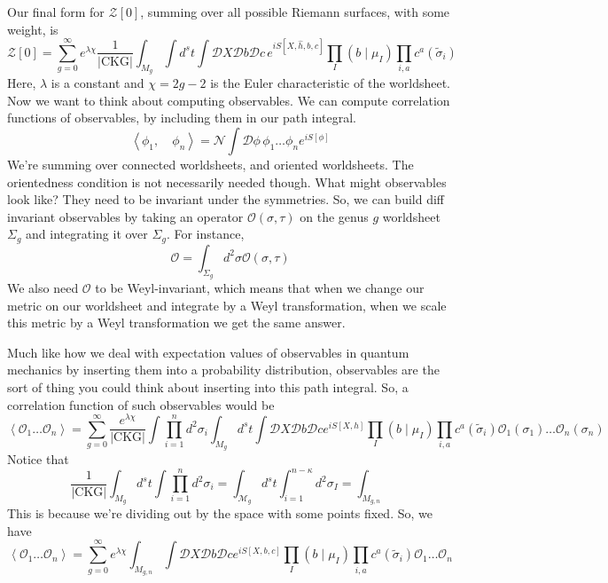 \documentclass[11pt, oneside]{article}   	%
\theoremstyle{slanted}
\begin{document}
Our final form for $ \mathcal{ Z } \left[  0  \right]  $, 
summing over all possible Riemann surfaces, with some weight, is 
\[
\mathcal{ Z } \left[  0  \right]   = \sum _{ g = 0 } ^ \infty 
e ^{ \lambda \chi }
\frac{1}{|\text{CKG}|} \int _{ M _ g } \int d ^ s t \int \mathcal{ D } X \mathcal{ D } b 
\mathcal{ D } c \, e ^{  i S \left[  X, \hat{ h }, b, c  \right]  } 
\prod_{ I } \left( b \mid \mu _ I  \right)  \prod _{ i , a } c ^ a \left( 
\tilde{ \sigma }_ i   \right) 
\] Here, $ \lambda $ is a constant and $ \chi  = 2g - 2 $ is 
the Euler characteristic of the worldsheet. 
Now we want to think about computing 
observables. We can compute correlation functions 
of observables, by including them 
in our path integral. 
\[
\left< \phi _1 , \quad \phi _ n  \right> 
= \mathcal{ N }\int \mathcal{ D } \phi \, \phi _ 1 \dots \phi _ n e ^{ i S \left[  \phi  \right] }
\] We're summing over connected worldsheets, 
and oriented worldsheets. The orientedness condition is not 
necessarily needed though. 
What might observables look like? They need 
to be invariant under the symmetries. So, we
can build diff invariant observables by taking 
an operator $ \mathcal{ O } \left( \sigma, \tau  \right)  $ 
on the genus $ g $ worldsheet $ \Sigma _ g $ and 
integrating it over $ \Sigma _ g $. For instance, 
\[
\mathcal{ O }  = \int _{ \Sigma _ g } d ^ 2 \sigma \mathcal{ O } \left( \sigma, \tau  \right) 
\] We also need $ \mathcal{ O } $ to be Weyl-invariant, 
which means that when we change our metric 
on our worldsheet and integrate by a Weyl transformation, 
when we scale this metric by a Weyl transformation we get 
the same answer. 

Much like how we deal with expectation values 
of observables in quantum mechanics 
by inserting them into a 
probability distribution, observables 
are the sort of thing you could think about 
inserting into this path integral. 
So, a correlation function of such observables 
would be 
\[
\left< \mathcal{ O }_ 1  \dots 
\mathcal{ O } _ n   \right>  = 
\sum _{ g = 0 } ^ \infty \frac{e ^{ \lambda \chi } }{ |\text{CKG}|}
\int \prod_{ i  =1  }^ n d ^ 2 \sigma _ i \int _{ M _ g } 
d ^ s t \int \mathcal{ D } X \mathcal{ D } b 
\mathcal{ D } c e ^{  i S \left[  X, h  \right]   } 
\prod _ I \left( b \mid \mu _ I  \right)  
\prod_{ i , a } c ^ a \left( \tilde{ \sigma } _ i   \right)  
\mathcal{ O  }_ 1 \left( \sigma _ 1  \right)  \dots 
\mathcal{ O} _ n \left( \sigma _n  \right)  
\] Notice that 
\[
\frac{1}{|\text{CKG}|} \int _{M _ g } d ^ s t \int \prod_{ i = 1 } ^ n 
d ^ 2 \sigma _ i  = \int _{ \mathcal{ M } _ g } d ^ s t \int _{ i  = 1 } 
^{ n - \kappa } d ^ 2 \sigma _ I  = \int _{ M _ {g, n }}
\] This is because we're dividing 
out by the space with some points fixed.
So, we have 
\[
\left< \mathcal{ O } _ 1  \dots \mathcal{ O } _ n  \right> 
= \sum_{ g = 0 } ^ \infty e ^{ \lambda \chi } 
\int _{ M _{g, n } } \int \mathcal{ D } X \mathcal{ D } b \mathcal{ D } c 
e ^{ i S \left[  X, b, c  \right]  } \prod_{ I } \left( b \mid \mu _ I  \right)  
\prod _{ i ,a  } c ^ a \left( \tilde{ \sigma } _ i   \right)  \mathcal{ O } _ 1 
\dots \mathcal{ O } _ n 
\] 
\end{document}
